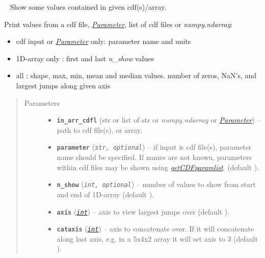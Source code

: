 \documentclass[letterpaper,10pt,english]{sphinxhowto}
\begin{document}
\begin{fulllineitems}
\label{swtools_doc:swtools.param_peek}~\label{swtools_doc:param-peek}
Show some values contained in given cdf(s)/array.

Print values from a cdf file, {\hyperref[swtools_doc:parameter]{\emph{Parameter}}}, list of cdf files or
\emph{numpy.ndarray}:
\begin{itemize}
\item {} 
cdf input or {\hyperref[swtools_doc:parameter]{\emph{Parameter}}} only: parameter name and units

\item {} 
1D-array only :  first and last \emph{n\_show} values

\item {} 
all : shape, max, min, mean and median values.
number of zeros, NaN's, and largest jumps along given axis

\end{itemize}
\begin{quote}\begin{description}
\item[{Parameters}] \leavevmode\begin{itemize}
\item {} 
\textbf{\texttt{in\_arr\_cdfl}} (str or list of str or \emph{numpy.ndarray} or {\hyperref[swtools_doc:parameter]{\emph{Parameter}}}) -- path to cdf file(s), or array.

\item {} 
\textbf{\texttt{parameter}} (\emph{\texttt{str, optional}}) -- if input is cdf file(s), parameter name should be specified. If
names are not known, parameters within cdf files may be shown
using {\hyperref[swtools_doc:getcdfparamlist]{\emph{getCDFparamlist}}}. (default ).

\item {} 
\textbf{\texttt{n\_show}} (\emph{\texttt{int, optional}}) -- number of values to show from start and end of 1D-array
(default ).

\item {} 
\textbf{\texttt{axis}} (\href{https://docs.python.org/library/functions.html\#int}{\emph{\texttt{int}}}) -- axis to view largest jumps over (default ).

\item {} 
\textbf{\texttt{cataxis}} (\href{https://docs.python.org/library/functions.html\#int}{\emph{\texttt{int}}}) -- axis to concatenate over. If  it will concatenate
along last axis, e.g. in a 5x4x2 array it will set axis to 3
(default ).

\end{itemize}

\end{description}\end{quote}

\end{fulllineitems}
\end{document}
